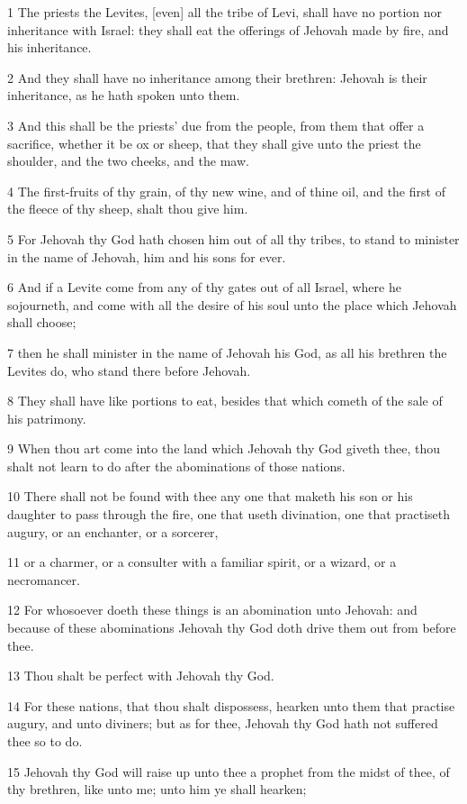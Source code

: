 \par 1 The priests the Levites, [even] all the tribe of Levi, shall have no portion nor inheritance with Israel: they shall eat the offerings of Jehovah made by fire, and his inheritance.
\par 2 And they shall have no inheritance among their brethren: Jehovah is their inheritance, as he hath spoken unto them.
\par 3 And this shall be the priests' due from the people, from them that offer a sacrifice, whether it be ox or sheep, that they shall give unto the priest the shoulder, and the two cheeks, and the maw.
\par 4 The first-fruits of thy grain, of thy new wine, and of thine oil, and the first of the fleece of thy sheep, shalt thou give him.
\par 5 For Jehovah thy God hath chosen him out of all thy tribes, to stand to minister in the name of Jehovah, him and his sons for ever.
\par 6 And if a Levite come from any of thy gates out of all Israel, where he sojourneth, and come with all the desire of his soul unto the place which Jehovah shall choose;
\par 7 then he shall minister in the name of Jehovah his God, as all his brethren the Levites do, who stand there before Jehovah.
\par 8 They shall have like portions to eat, besides that which cometh of the sale of his patrimony.
\par 9 When thou art come into the land which Jehovah thy God giveth thee, thou shalt not learn to do after the abominations of those nations.
\par 10 There shall not be found with thee any one that maketh his son or his daughter to pass through the fire, one that useth divination, one that practiseth augury, or an enchanter, or a sorcerer,
\par 11 or a charmer, or a consulter with a familiar spirit, or a wizard, or a necromancer.
\par 12 For whosoever doeth these things is an abomination unto Jehovah: and because of these abominations Jehovah thy God doth drive them out from before thee.
\par 13 Thou shalt be perfect with Jehovah thy God.
\par 14 For these nations, that thou shalt dispossess, hearken unto them that practise augury, and unto diviners; but as for thee, Jehovah thy God hath not suffered thee so to do.
\par 15 Jehovah thy God will raise up unto thee a prophet from the midst of thee, of thy brethren, like unto me; unto him ye shall hearken;
